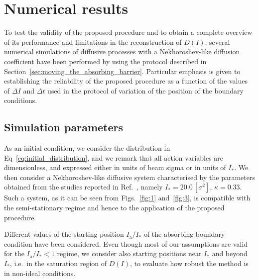 
\section{Numerical results}
\label{sec:numerical_results}


To test the validity of the proposed procedure and to obtain a complete overview of its performance and limitations in the reconstruction of $D(I)$, several numerical simulations of diffusive processes with a Nekhoroshev-like diffusion coefficient have been performed by using the protocol described in Section~\ref{sec:moving_the_absorbing_barrier}. Particular emphasis is given to establishing the reliability of the proposed procedure as a function of the values of $\Delta I$ and $\Delta t$ used in the protocol of variation of the position of the boundary conditions.


\subsection{Simulation parameters}


As an initial condition, we consider the distribution in Eq~\eqref{eq:initial_distribution}, and we remark that all action variables are {dimensionless, and expressed either in units of beam sigma or in units of $I_\ast$}. We then consider a Nekhoroshev-like diffusive system characterised by the parameters obtained from the studies reported in Ref.~\cite{bazzani2020diffusion}, namely $I_\ast = 20.0\,[\sigma^2]$, $\kappa = 0.33$. Such a system, as it can be seen from Figs.~\ref{fig:1} and~\ref{fig:3}, is compatible with the semi-stationary regime and hence to the application of the proposed procedure.

Different values of the starting position $I_\mathrm{a}/I_\ast$ of the absorbing boundary condition have been considered. Even though most of our assumptions are valid for the $I_\mathrm{a}/I_\ast < 1$ regime, we consider also starting positions near $I_\ast$ and beyond $I_\ast$, i.e.\ in the saturation region of $D(I)$, to evaluate how robust the method is in non-ideal conditions.

